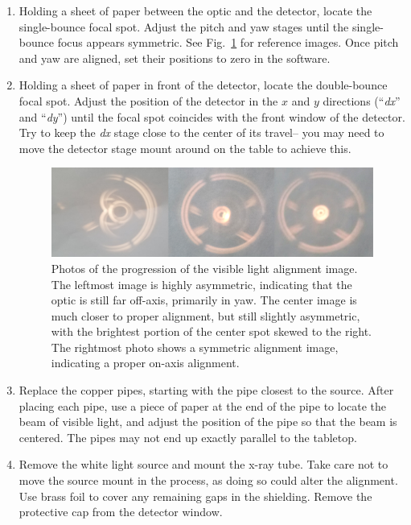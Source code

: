 \begin{enumerate}
\item Holding a sheet of paper between the optic and the detector, locate the
  single-bounce focal spot. Adjust the pitch and yaw stages until the
  single-bounce focus appears symmetric. See Fig.~\ref{fig:vis_align} for
  reference images. Once pitch and yaw are aligned, set their positions to zero
  in the software.

\item Holding a sheet of paper in front of the detector, locate the
  double-bounce focal spot. Adjust the position of the detector in the $x$ and
  $y$ directions (``\textit{dx}'' and ``\textit{dy}'') until the focal spot
  coincides with the front window of the detector. Try to keep the \textit{dx}
  stage close to the center of its travel-- you may need to move the detector
  stage mount around on the table to achieve this.

\begin{figure}
\includegraphics[width=\textwidth]{vis_align.png}
\caption{\label{fig:vis_align} Photos of the progression of the visible light
  alignment image. The leftmost image is highly asymmetric, indicating that the
  optic is still far off-axis, primarily in yaw. The center image is much closer
to proper alignment, but still slightly asymmetric, with the brightest portion
of the center spot skewed to the right. The rightmost photo shows a symmetric
alignment image, indicating a proper on-axis alignment.}
\end{figure}

\item Replace the copper pipes, starting with the pipe closest to the
  source. After placing each pipe, use a piece of paper at the end of the pipe
  to locate the beam of visible light, and adjust the position of the pipe so
  that the beam is centered. The pipes may not end up exactly parallel to the
  tabletop.

\item Remove the white light source and mount the x-ray tube. Take care not to
  move the source mount in the process, as doing so could alter the
  alignment. Use brass foil to cover any remaining gaps in the shielding. Remove
  the protective cap from the detector window.

\end{enumerate}


